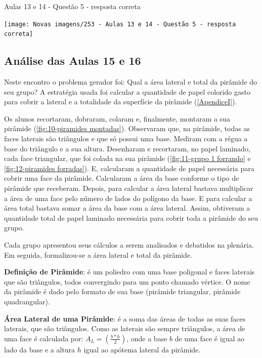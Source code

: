 \begin{CenteredFigure}
    \caption{Aulas 13 e 14 - Questão 5 - resposta correta} \label{fig: 253 - Aulas 13 e 14 - Questao 5 - resposta correta}
    \texttt{[image: Novas imagens/253 - Aulas 13 e 14 - Questão 5 - resposta correta]}
    \legend{\autoria}
\end{CenteredFigure}

\subsection{Análise das Aulas 15 e 16}

Neste encontro o problema gerador foi: Qual a área lateral e total da pirâmide do seu grupo? A estratégia usada foi calcular a quantidade de papel colorido gasto para cobrir a lateral e a totalidade da superfície da pirâmide (\autoref{ApendiceI}).

Os alunos recortaram, dobraram, colaram e, finalmente, montaram a sua pirâmide (\autoref{fig:10-piramides montadas}). Observaram que, na pirâmide, todas as faces laterais são triângulos e que só possui uma base. Mediram com a régua a base do triângulo e a sua altura. Desenharam e recortaram, no papel laminado, cada face triangular, que foi colada na sua pirâmide (\autoref{fig:11-grupo 1 forrando} e \autoref{fig:12-piramides forradas}).  E, calcularam a quantidade de papel necessária para cobrir uma face da pirâmide. Calcularam a área da base conforme o tipo de pirâmide que receberam. Depois, para calcular a área lateral bastava multiplicar a área de uma face pelo número de lados do polígono da base. E para calcular a área total bastava somar a área da base com a área lateral. Assim, obtiveram a quantidade total de papel laminado necessária para cobrir toda a pirâmide do seu grupo.

Cada grupo apresentou seus cálculos a serem analisados e debatidos na plenária. Em seguida, formalizou-se a área lateral e total da pirâmide.

\textbf{Definição de Pirâmide}: é um poliedro com uma base poligonal e faces laterais que são triângulos, todos convergindo para um ponto chamado vértice. O nome da pirâmide é dado pelo formato de sua base (pirâmide triangular, pirâmide quadrangular).

\textbf{Área Lateral de uma Pirâmide}: é a soma das áreas de todas as suas faces laterais, que são triângulos. Como as laterais são sempre triângulos, a área de uma face é calculada por: $A_L = \left( \frac{b*h}{2}  \right)$, onde a base $b$ de uma face é igual ao lado da base e a altura $h$ igual ao apótema lateral da pirâmide.

